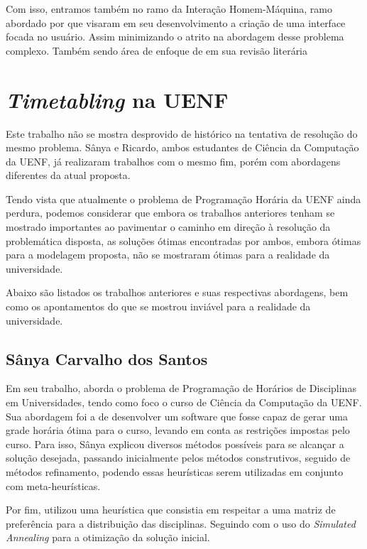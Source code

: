 Com isso, entramos também no ramo da Interação Homem-Máquina, ramo abordado por  que visaram em seu desenvolvimento a criação de uma interface focada no usuário. Assim minimizando o atrito na abordagem desse problema complexo. Também sendo área de enfoque de  em sua revisão literária

\section{\textit{Timetabling} na UENF} \label{sec:anteriores} %

Este trabalho não se mostra desprovido de histórico na tentativa de resolução do mesmo problema. Sânya e Ricardo, ambos estudantes de Ciência da Computação da UENF, já realizaram trabalhos com o mesmo fim, porém com abordagens diferentes da atual proposta.

Tendo vista que atualmente o problema de Programação Horária da UENF ainda perdura, podemos considerar que embora os trabalhos anteriores tenham se mostrado importantes ao pavimentar o caminho em direção à resolução da problemática disposta, as soluções ótimas encontradas por ambos, embora ótimas para a modelagem proposta, não se mostraram ótimas para a realidade da universidade.

Abaixo são listados os trabalhos anteriores e suas respectivas abordagens, bem como os apontamentos do que se mostrou inviável para a realidade da universidade.

\subsection{Sânya Carvalho dos Santos} \label{subsec:sanya}   %

Em seu trabalho,  aborda o problema de Programação de Horários de Disciplinas em Universidades, tendo como foco o curso de Ciência da Computação da UENF. Sua abordagem foi a de desenvolver um software que fosse capaz de gerar uma grade horária ótima para o curso, levando em conta as restrições impostas pelo curso. Para isso, Sânya explicou diversos métodos possíveis para se alcançar a solução desejada, passando inicialmente pelos métodos construtivos, seguido de métodos refinamento, podendo essas heurísticas serem utilizadas em conjunto com meta-heurísticas.

Por fim, utilizou uma heurística que consistia em respeitar a uma matriz de preferência para a distribuição das disciplinas. Seguindo com o uso do \textit{Simulated Annealing} para a otimização da solução inicial.

